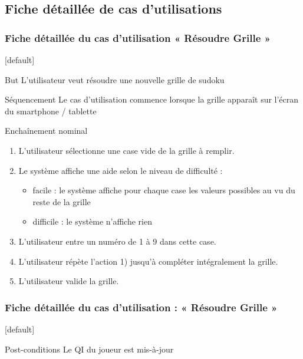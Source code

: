 \documentclass{beamer}
\begin{document}
\subsection{Fiche détaillée de cas d’utilisations}
\begin{frame}
  \frametitle{Fiche détaillée du cas d'utilisation « Résoudre Grille »}
  [default]
  \begin{block}{\footnotesize{But}}
\scriptsize{L'utilisateur veut résoudre une nouvelle grille de sudoku}
  \end{block}
  \pause
  \begin{block}{\footnotesize{Séquencement}}
\scriptsize{Le cas d'utilisation commence lorsque la grille apparaît sur l'écran du
    smartphone / tablette}
  \end{block}
  \pause
  \begin{block}{\footnotesize{Enchaînement nominal}}
    \begin{enumerate}    
      [circle]
    \item
      \scriptsize{L'utilisateur sélectionne une case vide de la grille à remplir.}
      \pause
    \item
      \scriptsize{Le système affiche une aide selon le niveau de difficulté :}
      \pause
      \begin{itemize}
        [circle]
      \item
        \scriptsize{facile : le système affiche pour chaque case les valeurs possibles au vu du
        reste de la grille}
      \item
        \scriptsize{difficile : le système n'affiche rien}
      \end{itemize}
      \pause
    \item
      \scriptsize{L'utilisateur entre un numéro de 1 à 9 dans cette case.}
      \pause
    \item
      \scriptsize{L'utilisateur répète l'action 1) jusqu'à compléter intégralement la grille.}
      \pause
    \item
      \scriptsize{L'utilisateur valide la grille.}
    \end{enumerate}
  \end{block}
\end{frame}
\begin{frame}
\frametitle{Fiche détaillée du cas d'utilisation : « Résoudre Grille »}
[default]
  \begin{block}{\footnotesize{Post-conditions}}
    \scriptsize{Le QI du joueur est mis-à-jour}
  \end{block}
  \pause

\end{frame}
\end{document}
